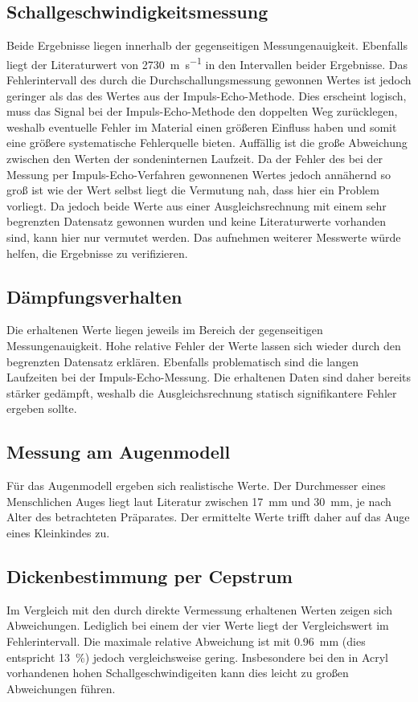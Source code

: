 \subsection{Schallgeschwindigkeitsmessung}
Beide Ergebnisse liegen innerhalb der gegenseitigen Messungenauigkeit. Ebenfalls liegt
der Literaturwert\cite{acryl} von \SI[per-mode=reciprocal]{2730}{\metre\per\second} in den Intervallen
beider Ergebnisse. Das Fehlerintervall des durch die Durchschallungsmessung gewonnen Wertes
ist jedoch geringer als das des Wertes aus der Impuls-Echo-Methode. Dies erscheint logisch,
muss das Signal bei der Impuls-Echo-Methode den doppelten Weg zurücklegen, weshalb eventuelle
Fehler im Material einen größeren Einfluss haben und somit eine größere systematische
Fehlerquelle bieten. Auffällig ist die große Abweichung zwischen den Werten der sondeninternen
Laufzeit. Da der Fehler des bei der Messung per Impuls-Echo-Verfahren gewonnenen Wertes
jedoch annähernd so groß ist wie der Wert selbst liegt die Vermutung nah, dass hier ein
Problem vorliegt. Da jedoch beide Werte aus einer Ausgleichsrechnung mit einem sehr
begrenzten Datensatz gewonnen wurden und keine Literaturwerte vorhanden sind, kann hier nur
vermutet werden. Das aufnehmen weiterer Messwerte würde helfen, die Ergebnisse zu verifizieren.
\subsection{Dämpfungsverhalten}
Die erhaltenen Werte liegen jeweils im Bereich der gegenseitigen Messungenauigkeit.
Hohe relative Fehler der Werte lassen sich wieder durch den begrenzten Datensatz
erklären. Ebenfalls problematisch sind die langen Laufzeiten bei der Impuls-Echo-Messung.
Die erhaltenen Daten sind daher bereits stärker gedämpft, weshalb die Ausgleichsrechnung
statisch signifikantere Fehler ergeben sollte.
\subsection{Messung am Augenmodell}
Für das Augenmodell ergeben sich realistische Werte. Der Durchmesser eines Menschlichen
Auges liegt laut Literatur\cite{auge} zwischen \SI{17}{\milli\metre} und \SI{30}{\milli\metre},
je nach Alter des betrachteten Präparates. Der ermittelte Werte trifft daher auf das Auge eines
Kleinkindes zu.
\subsection{Dickenbestimmung per Cepstrum}
Im Vergleich mit den durch direkte Vermessung erhaltenen Werten zeigen sich Abweichungen.
Lediglich bei einem der vier Werte liegt der Vergleichswert im Fehlerintervall. Die maximale relative
Abweichung ist mit \SI{0.96}{\milli\metre} (dies entspricht \SI{13}{\percent}) jedoch
vergleichsweise gering. Insbesondere bei den in Acryl vorhandenen hohen Schallgeschwindigeiten
kann dies leicht zu großen Abweichungen führen.



\newpage
\nocite{*}
\printbibliography
